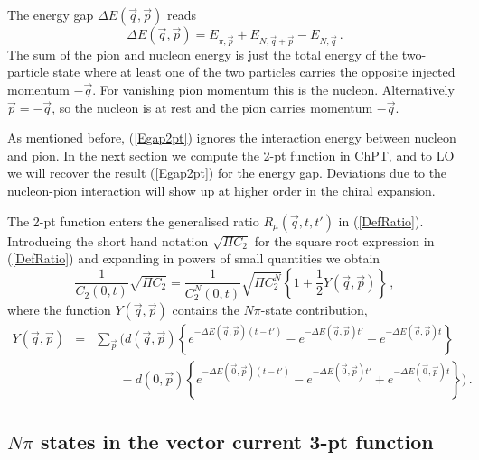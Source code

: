 \documentclass[11pt,prd,aps,showpacs,eqsecnum,floatfix,nofootinbib,preprint,tightenlines]{revtex4}
\newcommand{\nn}{\nonumber}
\newcommand{\pref}[1]{(\ref{#1})}
\newcommand{\np}{N\pi}
\newcommand{\ENq}{E_{N,\vec{q}}}
\begin{document}
The energy gap $\Delta E(\vec{q},\vec{p})$ reads
\begin{equation}\label{Egap2pt}
\Delta E(\vec{q},\vec{p}) = E_{\pi,\vec{p}} + E_{N,\vec{q}+\vec{p}} - \ENq\,.
\end{equation}
The sum of the pion and nucleon energy is just the total energy of the two-particle state where at least one of the two particles carries the opposite injected momentum $-\vec{q}$. For vanishing pion momentum this is the nucleon. Alternatively $\vec{p}=-\vec{q}$, so the nucleon is at rest and the pion carries momentum $-\vec{q}$.

As mentioned before, \pref{Egap2pt} ignores the interaction energy between nucleon and pion. In the next section we compute the 2-pt function in ChPT, and to LO we will recover the result  \pref{Egap2pt} for the energy gap. Deviations due to the nucleon-pion interaction will show up at higher order in the chiral expansion.

The 2-pt function enters the generalised ratio $R_{\mu}(\vec{q},t,t')$ in \pref{DefRatio}. Introducing the short hand notation $\sqrt{\Pi C_2}$ for the square root expression in \pref{DefRatio} and expanding in powers of small quantities we obtain
\begin{equation}\label{ratio2ptGeneric}
\frac{1}{C_2(0,t)}\sqrt{\Pi C_2} = \frac{1}{C^N_2(0,t)}\sqrt{\Pi C^N_2} \left\{ 1+ \frac{1}{2} Y(\vec{q},\vec{p})\right\}\,,
\end{equation}
where the function $Y(\vec{q},\vec{p})$ contains the $\np$-state contribution,
\begin{eqnarray}
Y(\vec{q},\vec{p})&=&\sum_{\vec{p}}\Bigg(d(\vec{q},\vec{p})  \left\{ e^{-\Delta E(\vec{q},\vec{p}) (t-t')} - e^{-\Delta E(\vec{q},\vec{p}) t'} - e^{-\Delta E(\vec{q},\vec{p}) t}\right\}\nn\\
& & \phantom{\sum_{\vec{p}}} - d(0,\vec{p})  \left\{ e^{-\Delta E(\vec{0},\vec{p}) (t-t')} - e^{-\Delta E(\vec{0},\vec{p}) t'} + e^{-\Delta E(\vec{0},\vec{p}) t}\right\}\Bigg)\,.\label{DefY}
\end{eqnarray}

\subsection{$N\pi$ states in the vector current 3-pt function }
\end{document}
